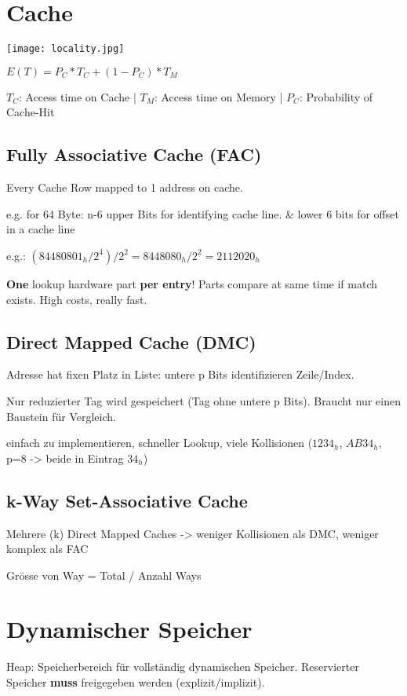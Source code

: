 \begin{multicols*}{4}
\section{Cache}
\texttt{[image: locality.jpg]}

\(E(T) = P_C * T_C + (1 - P_C )* T_M\)

\(T_C\): Access time on Cache |
\(T_M\): Access time on Memory |
\(P_C\): Probability of Cache-Hit

\subsection{Fully Associative Cache (FAC)}
Every Cache Row mapped to 1 address on cache.

e.g. for 64 Byte: n-6 upper Bits for identifying cache line. \& lower 6 bits for offset in a cache line

e.g.: \((84480801_h / 2^4) / 2^2 = 8448080_h / 2^2 = 2112020_h\)

\textbf{One} lookup hardware part \textbf{per entry}! Parts compare at same time if match exists. High costs, really fast.

\subsection{Direct Mapped Cache (DMC)}

Adresse hat fixen Platz in Liste: untere p Bits identifizieren Zeile/Index.

Nur reduzierter Tag wird gespeichert (Tag ohne untere p Bits). Braucht nur einen Baustein für Vergleich.

einfach zu implementieren, schneller Lookup, viele Kollisionen (\(1234_h\), \(AB34_h\), p=8 -> beide in Eintrag \(34_h\))


\subsection{k-Way Set-Associative Cache}
Mehrere (k) Direct Mapped Caches -> weniger Kollisionen als DMC, weniger komplex als FAC

Grösse von Way = Total / Anzahl Ways

\section{Dynamischer Speicher}
Heap: Speicherbereich für vollständig dynamischen Speicher. Reservierter Speicher \textbf{muss} freigegeben werden (explizit/implizit).


\end{multicols*}
